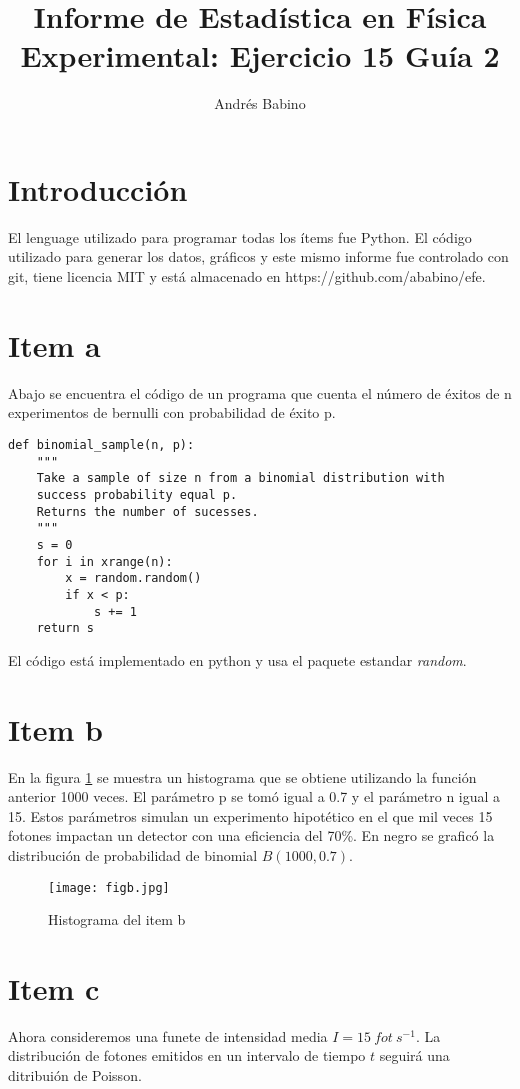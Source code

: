 \documentclass{article}
\title{Informe de Estadística en Física Experimental: Ejercicio 15 Guía 2}
\author{Andr\'es Babino}
\begin{document}
\maketitle
\section{Introducción}
El lenguage utilizado para programar todas los ítems fue Python.
El código utilizado para generar los datos, gráficos y este mismo informe fue controlado con git, tiene licencia MIT y está almacenado en https://github.com/ababino/efe.

\section{Item a}
Abajo se encuentra el código de un programa que cuenta el número de éxitos de n experimentos de bernulli  con probabilidad de éxito p.
\begin{lstlisting}
def binomial_sample(n, p):
    """
    Take a sample of size n from a binomial distribution with
    success probability equal p.
    Returns the number of sucesses.
    """
    s = 0
    for i in xrange(n):
        x = random.random()
        if x < p:
            s += 1
    return s
\end{lstlisting}
El código está implementado en python y usa el paquete estandar \textit{random}.

\section{Item b}
En la figura \ref{fig:itemb} se muestra un histograma que se obtiene utilizando la función anterior 1000 veces.
El parámetro p se tomó igual a 0.7 y el parámetro n igual a 15.
Estos parámetros simulan un experimento hipotético en el que mil veces 15 fotones impactan un detector con una eficiencia del 70\%.
En negro se graficó la distribución de probabilidad de binomial $B(1000, 0.7)$.

\begin{figure}
\centering
\texttt{[image: figb.jpg]}
\caption[]{Histograma del item b}
\label{fig:itemb}
\end{figure}

\section{Item c}
Ahora consideremos una funete de intensidad media $I=15\ fot\ s^{-1}$.
La distribución de fotones emitidos en un intervalo de tiempo $t$ seguirá una ditribuión de Poisson.
\end{document}
